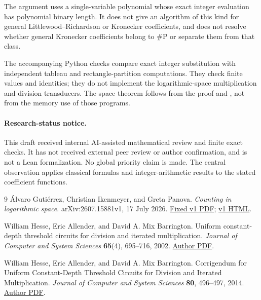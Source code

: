 \documentclass[11pt]{article}
\begin{document}
The argument uses a single-variable polynomial whose exact integer
evaluation has polynomial binary length. It does not give an algorithm
of this kind for general Littlewood--Richardson or Kronecker coefficients,
and does not resolve whether general Kronecker coefficients belong to
$\#\mathrm P$ or separate them from that class.

The accompanying Python checks compare exact integer substitution with
independent tableau and rectangle-partition computations. They check
finite values and identities; they do not implement the logarithmic-space
multiplication and division transducers. The space theorem follows from
the proof and \cite{HAB}, not from the memory use of those programs.

\paragraph{Research-status notice.}
This draft received internal AI-assisted mathematical review and finite
exact checks. It has not received external peer review or author
confirmation, and is not a Lean formalization. No global priority claim
is made. The central observation applies classical formulas and
integer-arithmetic results to the stated coefficient functions.

\begin{thebibliography}{9}
\'Alvaro Guti\'errez, Christian Ikenmeyer, and Greta Panova.
\emph{Counting in logarithmic space}.
arXiv:2607.15881v1, 17 July 2026.
\href{https://arxiv.org/pdf/2607.15881v1}{Fixed v1 PDF};
\href{https://arxiv.org/html/2607.15881v1}{v1 HTML}.

William Hesse, Eric Allender, and David A. Mix Barrington.
Uniform constant-depth threshold circuits for division and iterated
multiplication.
\emph{Journal of Computer and System Sciences} \textbf{65}(4),
695--716, 2002.
\href{https://people.cs.rutgers.edu/~allender/papers/division.pdf}{Author PDF}.

William Hesse, Eric Allender, and David A. Mix Barrington.
Corrigendum for Uniform Constant-Depth Threshold Circuits for Division
and Iterated Multiplication.
\emph{Journal of Computer and System Sciences} \textbf{80},
496--497, 2014.
\href{https://people.cs.rutgers.edu/~allender/papers/hab.corrigendum.pdf}{Author PDF}.
\end{thebibliography}
\end{document}
